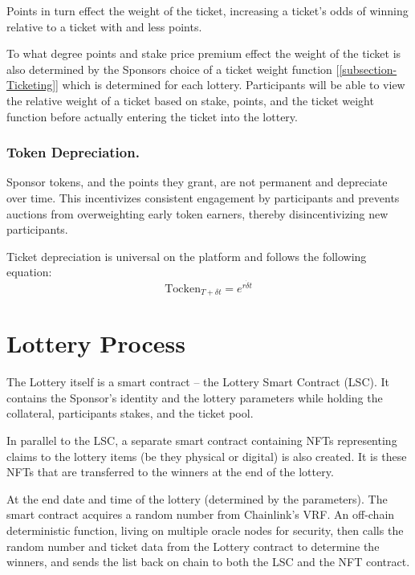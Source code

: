 \documentclass[runningheads]{llncs}
\begin{document}
Points in turn effect the weight of the ticket, increasing a ticket’s odds of winning relative to a ticket with and less points.  

To what degree points and stake price premium effect the weight of the ticket is also determined by the Sponsors choice of a ticket weight function [\ref{subsection-Ticketing}] which is determined for each lottery.  Participants will be able to view the relative weight of a ticket based on stake, points, and the ticket weight function before actually entering the ticket into the lottery.


\subsubsection{Token Depreciation.}  Sponsor tokens, and the points they grant, are not permanent and depreciate over time.  This incentivizes consistent engagement by participants and prevents auctions from overweighting  early token earners, thereby disincentivizing new participants.

Ticket depreciation is universal on the platform and follows the following equation:
\begin{equation}
\textrm{Tocken}_{T+\delta t} = e^{r \dot \delta t}
\end{equation} 


\section{Lottery Process}\label{section-LotteryProcess}
The Lottery itself is a smart contract – the Lottery Smart Contract (LSC).  It contains the Sponsor’s identity and the lottery parameters while holding the collateral, participants stakes, and the ticket pool.

In parallel to the LSC, a separate smart contract containing NFTs representing claims to the lottery items (be they physical or digital) is also created.  It is these NFTs that are transferred to the winners at the end of the lottery.

At the end date and time of the lottery (determined by the parameters).  The smart contract acquires a random number from Chainlink’s VRF.  An off-chain deterministic function, living on multiple oracle nodes for security, then calls the random number and ticket data from the Lottery contract to determine the winners, and sends the list back on chain to both the LSC and the NFT contract.
\end{document}
